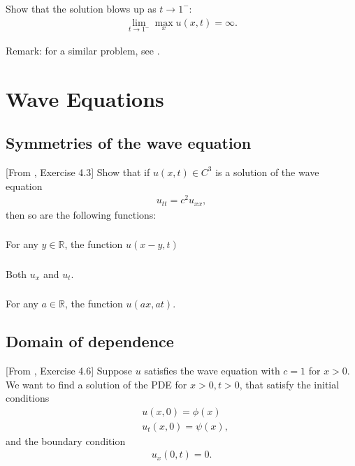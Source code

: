 \documentclass[11pt,letterpaper]{report}
\begin{document}
\subsection{}
Show that the solution blows up as $t\to 1^-$:
\begin{align}
    \lim_{t\to 1^-} \max_x u(x,t) = \infty.
\end{align}

Remark: for a similar problem, see \cite[Exercise 2.2.11]{Olver_14}.

\chapter{Wave Equations}
\section{Symmetries of the wave equation}
[From \cite{ShearerLevy_15}, Exercise 4.3] Show that if $u(x,t)\in C^3$ is a solution of the wave equation
\begin{align}
    u_{tt} = c^2u_{xx},
\end{align}
then so are the following functions:

\subsection{}
For any $y\in\mathbb{R}$, the function $u(x-y,t)$

\subsection{}
Both $u_x$ and $u_t$.

\subsection{}
For any $a\in\mathbb{R}$, the function $u(ax,at)$. 

\section{Domain of dependence}
[From \cite{ShearerLevy_15}, Exercise 4.6] Suppose $u$ satisfies the wave equation with $c=1$ for $x>0$. We want to find a solution of the PDE for $x>0, t>0$, that satisfy the initial conditions
\begin{align}
    & u(x,0) = \phi(x)\\
    & u_t(x,0) = \psi(x),
\end{align}
and the boundary condition
\begin{align}
    u_x(0,t) = 0.
\end{align}
\end{document}
